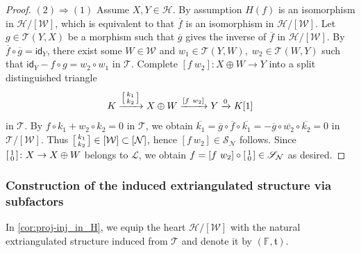 \documentclass[a4paper,reqno,10pt]{amsart}
\DeclareRobustCommand{\darkblueedit}[1]{#1}
\theoremstyle{definition}
\theoremstyle{definition}
\theoremstyle{definition}
\theoremstyle{definition}
\theoremstyle{plain}
\newcommand{\id}{\mathsf{id}}
\newcommand{\ft}{\mathfrak{t}}
\newcommand{\BF}{\mathbb{F}}
\newcommand{\CH}{\mathcal{H}}
\newcommand{\CL}{\mathcal{L}}
\newcommand{\CN}{\mathcal{N}}
\newcommand{\CT}{\mathcal{T}}
\newcommand{\CW}{\mathcal{W}}
\renewcommand{\SS}{\mathscr{S}}
\begin{document}
\begin{proof}
$(2)\Rightarrow(1)$ 
Assume $X,Y\in\CH$. By assumption $H(f)$ is an isomorphism in $\CH/[\CW]$, which is equivalent to that $\overline{f}$ is an isomorphism in $\CH/[\CW]$. Let $g\in\CT(Y,X)$ \darkblueedit{be a morphism such that} $\overline{g}$ gives the inverse of $\overline{f}$ in $\CH/[\CW]$. By $\overline{f}\circ\overline{g}=\id_Y$, there exist some $W\in\CW$ and \darkblueedit{$w_1\in\CT(Y,W),\;w_2\in\CT(W,Y)$} such that $\id_Y-f\circ g=w_2\circ w_1$ in $\CT$.
Complete $[f\ w_2]\colon X\oplus W\to Y$ into a split distinguished triangle
\[
K\xrightarrow{\begin{bsmallmatrix}
k_1\\
k_2
\end{bsmallmatrix}}
X\oplus W\xrightarrow{[f\ w_2]}Y\xrightarrow{0}K[1]
\]
in $\CT$. By $f\circ k_1+w_2\circ k_2=0$ in $\CT$, we obtain $\overline{k_1}=\overline{g}\circ\overline{f}\circ\overline{k_1}=-\overline{g}\circ\overline{w_2}\circ\overline{k_2}=0$ in $\CT/[\CW]$. Thus $\begin{bsmallmatrix}
k_1\\
k_2
\end{bsmallmatrix}\in [\CW]\subset [\CN]$, hence $[f \ w_2]\in\SS_{\CN}$ follows.
Since $\begin{bsmallmatrix}
1\\
0
\end{bsmallmatrix}\colon X\to X\oplus W$ belongs to $\CL$, we obtain $f=[f \ w_2]\circ\begin{bsmallmatrix}
1\\
0
\end{bsmallmatrix}\in\SS_{\CN}$ as desired.
\end{proof}


\subsubsection{Construction of the induced extriangulated structure via subfactors}

In \cref{cor:proj-inj_in_H}, we equip the heart $\CH/[\CW]$ with the natural extriangulated structure induced from $\CT$ and denote it by $(\BF,\ft)$\darkblueedit{.}

\normalcolor
\end{document}
